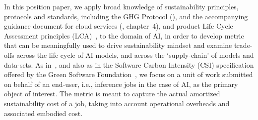 In this position paper, we apply broad knowledge of sustainability principles, protocols and standards,
including the GHG Protocol (\cite{ghg-potoc}), and the accompanying guidance document for cloud services (\cite{ghg-guid}, chapter~$4$), and product Life Cycle Assessment principles (LCA)~\cite{lca},
to the domain of AI, in order to develop metric that can be meaningfully used to drive sustainability mindset and examine trade-offs across the life cycle of AI models, and across the `supply-chain' of models and data-sets.  
%
%
As in~\cite{gandhi2022metrics}, and also as in the Software Carbon Intensity (CSI) specification offered by the Green Software Foundation~\cite{GSF}, we focus on a unit of work submitted on behalf of an end-user, i.e., inference jobs in the case of AI, as the primary object of interest. The metric is meant to capture the actual amortized sustainability cost
of a job, taking into account operational overheads and associated embodied cost. 

